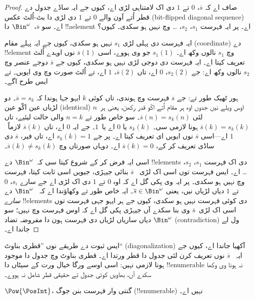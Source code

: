 \documentclass[../../../include/open-logic-section]{subfiles}
\begin{document}
\begin{proof}
صاف اے کہ $\overline{s}$، $0$ تے $1$ دی اک لامتناہی لڑی اے، کیوں جے
ایہ ساڈے جدول دے قطر اُتے آون والے $0$ تے $1$ دی لڑی دا بٹ-اُلٹ عکس
(bit-flipped diagonal sequence)
اے۔ سو $\overline{s}$،~$\Bin^\omega$ دا !!a{element} اے۔ پر ایہ
فہرست $s_1$، $s_2$، \dots{} وچ نہیں ہو سکدی۔ کیوں؟

ایہ فہرست دی پہلی لڑی $s_1$ نہیں ہو سکدی، کیوں جے ایہ پہلے مقام
(coordinate) دے
!!{element} وچ $s_1$ نالوں وکھ اے۔ $s_1(1)$ جو وی ہووے، اسی
$\overline{s}(1)$ نوں اوہدے اُلٹ تعریف کیتا اے۔ ایہ فہرست دی دوجی
لڑی نہیں ہو سکدی، کیوں جے $\overline{s}$ دوجے عنصر وچ $s_2$ نالوں
وکھ اے: جے $s_2(2)$، $0$ اے، تاں $\overline{s}(2)$، $1$ اے، تے
اُلٹ صورت وچ وی ایویں۔ تے ایس طرح اگے۔

ہور ٹھیک طور تے: جے $\overline{s}$ فہرست وچ ہوندی، تاں کوئی $k$ ایہو
جہا ہوندا کہ $\overline{s} = s_{k}$۔ دو لڑیاں عین اکّو عین
(identical) اوس ویلے
نیں جدوں اوہ ہر مقام اُتے اکّو قدر رکھن، یعنی ہر~$n$ لئی
$\overline{s}(n) = s_{k}(n)$۔ سو خاص طور تے $n = k$ والی حالت لیئیے،
تاں $\overline{s}(k) = s_{k}(k)$ ہونا لازمی سی۔ $s_k(k)$ یا $0$ اے
یا~$1$۔ جے ایہ $0$ اے، تاں $\overline{s}(k)$ لازماً~$1$ اے---اسی
$\overline{s}$ نوں ایویں ای تعریف کیتا اے۔ پر جے $s_k(k) = 1$ اے،
تاں فیر، $\overline{s}$ دی ساڈی تعریف کر کے، $\overline{s}(k) = 0$
اے۔ دوہاں صورتاں وچ $\overline{s}(k) \neq s_{k}(k)$۔

اسی ایہ فرض کر کے شروع کیتا سی کہ~$\Bin^\omega$ دے !!{element}s دی
اک فہرست $s_1$، $s_2$، \dots{} اے۔ ایس فہرست توں اسی اک لڑی
~$\overline{s}$ بنائی جیہڑی، جیویں اسی ثابت کیتا، فہرست وچ نہیں ہو
سکدی۔ پر ایہ وی پکی گل اے کہ اوہ $0$ تے $1$ دی اک لڑی اے جے سارے
$s_i$، $0$ تے $1$ دیاں لڑیاں نیں، یعنی
$\overline{s} \in \Bin^\omega$۔ ایہ خاص طور تے وکھاؤندا اے کہ
~$\Bin^\omega$ دے \emph{سارے} !!{element}s دی کوئی فہرست نہیں ہو
سکدی، کیوں جے ہر ایہو جہی فہرست توں اسی اک لڑی~$\overline{s}$ وی بنا
سکدے آں جیہڑی پکی گل اے کہ اوس فہرست وچ نہیں؛ سو $\Bin^\omega$ دیاں
ساریاں لڑیاں دی فہرست ہون دا مفروضہ تضاد (contradiction) ول لے جاندا
اے۔
\end{proof}

\begin{explain}
ایس ثبوت دے طریقے نوں ”قطری بناوٹ“ (diagonalization) آکھیا جاندا اے، کیوں جے ایہ
~$\overline{s}$ نوں تعریف کرن لئی جدول دا قطر ورتدا اے۔ قطری بناوٹ
وچ جدول دا موجود ہونا لازمی نہیں: اسی اوسے ورگا خیال ورت کے سیٹاں دا
!!{enumerable} نہ ہونا وی وکھا سکدے آں، بھاویں کوئی جدول تے حقیقی قطر
شامل نہ ہووے۔
\end{explain}

\begin{thm}
$\Pow{\PosInt}$، گنتی وار فہرست بنن جوگ (!!{enumerable}) نہیں اے۔
\end{thm}
\end{document}
